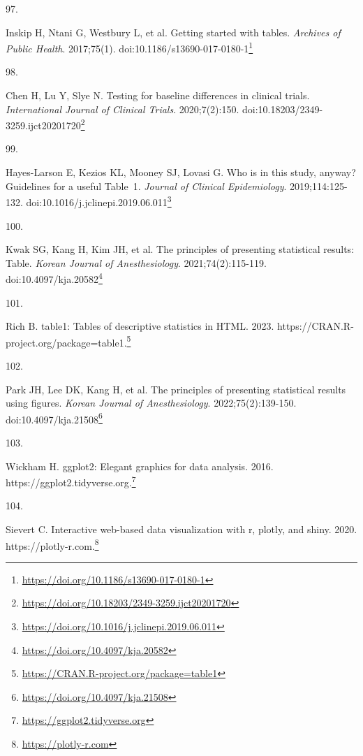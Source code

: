 \documentclass[
  a4paper,
]{book}
\newlength{\cslhangindent}
\newlength{\csllabelwidth}
\newlength{\cslentryspacingunit} %
\newenvironment{CSLReferences}[2] %
 {%
  \setlength{\parindent}{0pt}
  \ifodd #1
  \let\oldpar\par
  \def\par{\hangindent=\cslhangindent\oldpar}
  \fi
  \setlength{\parskip}{#2\cslentryspacingunit}
 }%
 {}
\newcommand{\CSLLeftMargin}[1]{\parbox[t]{\csllabelwidth}{#1}}
\newcommand{\CSLRightInline}[1]{\parbox[t]{\linewidth - \csllabelwidth}{#1}\break}
\renewcommand{\href}[2]{#2\footnote{\url{#1}}}
\begin{document}
\begin{CSLReferences}{0}{0}
\leavevmode{}%
\CSLLeftMargin{97. }%
\CSLRightInline{Inskip H, Ntani G, Westbury L, et al. Getting started with tables. \emph{Archives of Public Health}. 2017;75(1). doi:\href{https://doi.org/10.1186/s13690-017-0180-1}{10.1186/s13690-017-0180-1}}

\leavevmode{}%
\CSLLeftMargin{98. }%
\CSLRightInline{Chen H, Lu Y, Slye N. Testing for baseline differences in clinical trials. \emph{International Journal of Clinical Trials}. 2020;7(2):150. doi:\href{https://doi.org/10.18203/2349-3259.ijct20201720}{10.18203/2349-3259.ijct20201720}}

\leavevmode{}%
\CSLLeftMargin{99. }%
\CSLRightInline{Hayes-Larson E, Kezios KL, Mooney SJ, Lovasi G. Who is in this study, anyway? Guidelines for a useful Table~1. \emph{Journal of Clinical Epidemiology}. 2019;114:125-132. doi:\href{https://doi.org/10.1016/j.jclinepi.2019.06.011}{10.1016/j.jclinepi.2019.06.011}}

\leavevmode{}%
\CSLLeftMargin{100. }%
\CSLRightInline{Kwak SG, Kang H, Kim JH, et al. The principles of presenting statistical results: Table. \emph{Korean Journal of Anesthesiology}. 2021;74(2):115-119. doi:\href{https://doi.org/10.4097/kja.20582}{10.4097/kja.20582}}

\leavevmode{}%
\CSLLeftMargin{101. }%
\CSLRightInline{Rich B. table1: Tables of descriptive statistics in HTML. 2023. \href{https://CRAN.R-project.org/package=table1}{https://CRAN.R-project.org/package=table1.}}

\leavevmode{}%
\CSLLeftMargin{102. }%
\CSLRightInline{Park JH, Lee DK, Kang H, et al. The principles of presenting statistical results using figures. \emph{Korean Journal of Anesthesiology}. 2022;75(2):139-150. doi:\href{https://doi.org/10.4097/kja.21508}{10.4097/kja.21508}}

\leavevmode{}%
\CSLLeftMargin{103. }%
\CSLRightInline{Wickham H. ggplot2: Elegant graphics for data analysis. 2016. \href{https://ggplot2.tidyverse.org}{https://ggplot2.tidyverse.org.}}

\leavevmode{}%
\CSLLeftMargin{104. }%
\CSLRightInline{Sievert C. Interactive web-based data visualization with r, plotly, and shiny. 2020. \href{https://plotly-r.com}{https://plotly-r.com.}}


\end{CSLReferences}
\end{document}
